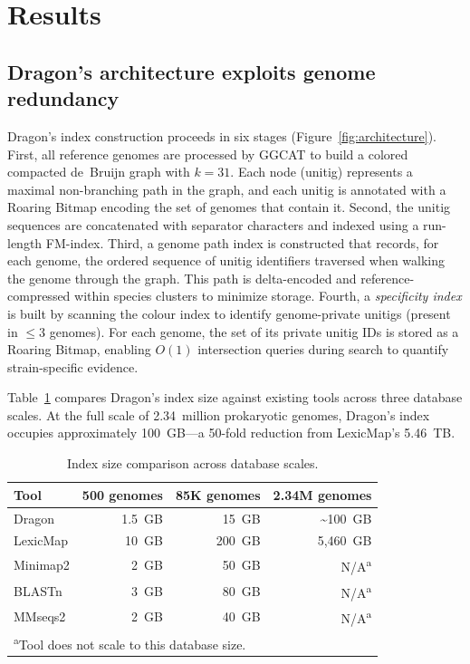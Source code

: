 \documentclass[11pt]{article}
\begin{document}
\section{Results}

\subsection{Dragon's architecture exploits genome redundancy}

Dragon's index construction proceeds in six stages (Figure~\ref{fig:architecture}). First, all reference genomes are processed by GGCAT \citep{cracco2023ggcat} to build a colored compacted de~Bruijn graph with $k=31$. Each node (unitig) represents a maximal non-branching path in the graph, and each unitig is annotated with a Roaring Bitmap \citep{lemire2018roaring} encoding the set of genomes that contain it. Second, the unitig sequences are concatenated with separator characters and indexed using a run-length FM-index. Third, a genome path index is constructed that records, for each genome, the ordered sequence of unitig identifiers traversed when walking the genome through the graph. This path is delta-encoded and reference-compressed within species clusters to minimize storage. Fourth, a \emph{specificity index} is built by scanning the colour index to identify genome-private unitigs (present in $\leq 3$ genomes). For each genome, the set of its private unitig IDs is stored as a Roaring Bitmap, enabling $O(1)$ intersection queries during search to quantify strain-specific evidence.

Table~\ref{tab:index_size} compares Dragon's index size against existing tools across three database scales. At the full scale of 2.34~million prokaryotic genomes, Dragon's index occupies approximately 100~GB---a 50-fold reduction from LexicMap's 5.46~TB.

\begin{table}[h]
\centering
\caption{Index size comparison across database scales.}
\label{tab:index_size}
\begin{tabular}{lrrr}
\toprule
\textbf{Tool} & \textbf{500 genomes} & \textbf{85K genomes} & \textbf{2.34M genomes} \\
\midrule
Dragon         & 1.5~GB  & 15~GB    & \textasciitilde100~GB \\
LexicMap       & 10~GB   & 200~GB   & 5,460~GB \\
Minimap2       & 2~GB    & 50~GB    & N/A\textsuperscript{a} \\
BLASTn         & 3~GB    & 80~GB    & N/A\textsuperscript{a} \\
MMseqs2        & 2~GB    & 40~GB    & N/A\textsuperscript{a} \\
\bottomrule
\multicolumn{4}{l}{\footnotesize \textsuperscript{a}Tool does not scale to this database size.}
\end{tabular}
\end{table}
\end{document}
